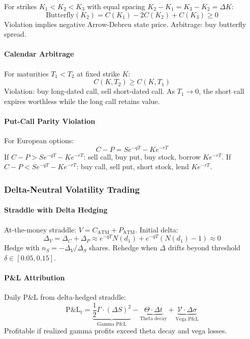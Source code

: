 For strikes $K_1 < K_2 < K_3$ with equal spacing $K_2 - K_1 = K_3 - K_2 = \Delta K$:
\[
\text{Butterfly}(K_2) = C(K_1) - 2 C(K_2) + C(K_3) \geq 0
\]
Violation implies negative Arrow-Debreu state price. Arbitrage: buy butterfly spread.

\paragraph{Calendar Arbitrage}

For maturities $T_1 < T_2$ at fixed strike $K$:
\[
C(K, T_2) \geq C(K, T_1)
\]
Violation: buy long-dated call, sell short-dated call. As $T_1 \to 0$, the short call expires worthless while the long call retains value.

\paragraph{Put-Call Parity Violation}

For European options:
\[
C - P = S e^{-qT} - K e^{-rT}
\]
If $C - P > S e^{-qT} - K e^{-rT}$: sell call, buy put, buy stock, borrow $K e^{-rT}$.
If $C - P < S e^{-qT} - K e^{-rT}$: buy call, sell put, short stock, lend $K e^{-rT}$.

\subsubsection{Delta-Neutral Volatility Trading}

\paragraph{Straddle with Delta Hedging}

At-the-money straddle: $V = C_{\text{ATM}} + P_{\text{ATM}}$. Initial delta:
\[
\Delta_V = \Delta_C + \Delta_P \approx e^{-qT} N(d_1) + e^{-qT} (N(d_1) - 1) \approx 0
\]
Hedge with $n_S = -\Delta_V / \Delta_S$ shares. Rehedge when $\Delta$ drifts beyond threshold $\delta \in [0.05, 0.15]$.

\paragraph{P\&L Attribution}

Daily P\&L from delta-hedged straddle:
\[
\text{P\&L}_t = \underbrace{\frac{1}{2} \Gamma \cdot (\Delta S)^2}_{\text{Gamma P\&L}} - \underbrace{\Theta \cdot \Delta t}_{\text{Theta decay}} + \underbrace{\mathcal{V} \cdot \Delta \sigma}_{\text{Vega P\&L}}
\]
Profitable if realized gamma profits exceed theta decay and vega losses.

